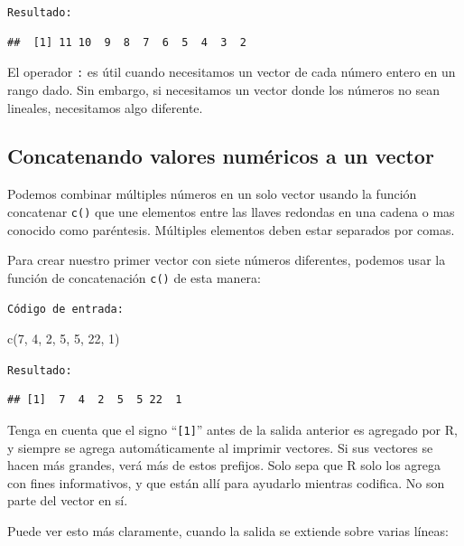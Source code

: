 \documentclass[
]{book}
\newenvironment{Shaded}{\begin{snugshade}}{\end{snugshade}}
\newcommand{\DecValTok}[1]{\textcolor[rgb]{0.00,0.00,0.81}{#1}}
\newcommand{\FunctionTok}[1]{\textcolor[rgb]{0.00,0.00,0.00}{#1}}
\newcommand{\NormalTok}[1]{#1}
\begin{document}
\texttt{Resultado:}

\begin{verbatim}
##  [1] 11 10  9  8  7  6  5  4  3  2
\end{verbatim}

El operador \texttt{:} es útil cuando necesitamos un vector de cada número entero en un rango dado. Sin embargo, si necesitamos un vector donde los números no sean lineales, necesitamos algo diferente.

\hypertarget{concatenando-valores-numuxe9ricos-a-un-vector}{%
\subsection{Concatenando valores numéricos a un vector}\label{concatenando-valores-numuxe9ricos-a-un-vector}}

Podemos combinar múltiples números en un solo vector usando la función concatenar \texttt{c()} que une elementos entre las llaves redondas en una cadena o mas conocido como paréntesis. Múltiples elementos deben estar separados por comas.

Para crear nuestro primer vector con siete números diferentes, podemos usar la función de concatenación \texttt{c()} de esta manera:

\texttt{Código\ de\ entrada:}

\begin{Shaded}
\begin{Highlighting}[]
\FunctionTok{c}\NormalTok{(}\DecValTok{7}\NormalTok{, }\DecValTok{4}\NormalTok{, }\DecValTok{2}\NormalTok{, }\DecValTok{5}\NormalTok{, }\DecValTok{5}\NormalTok{, }\DecValTok{22}\NormalTok{, }\DecValTok{1}\NormalTok{) }
\end{Highlighting}
\end{Shaded}

\texttt{Resultado:}

\begin{verbatim}
## [1]  7  4  2  5  5 22  1
\end{verbatim}

Tenga en cuenta que el signo ``\texttt{{[}1{]}}'' antes de la salida anterior es agregado por R, y siempre se agrega automáticamente al imprimir vectores. Si sus vectores se hacen más grandes, verá más de estos prefijos. Solo sepa que R solo los agrega con fines informativos, y que están allí para ayudarlo mientras codifica. No son parte del vector en sí.

Puede ver esto más claramente, cuando la salida se extiende sobre varias líneas:
\end{document}
